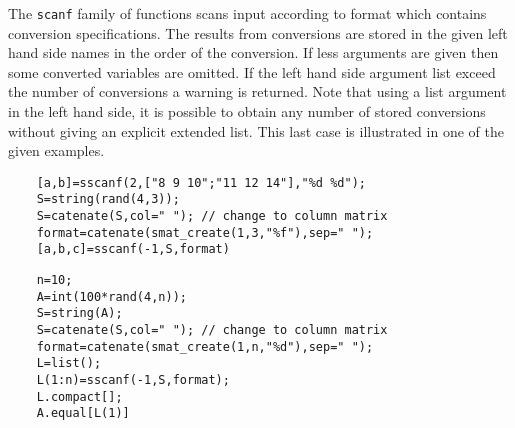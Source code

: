\begin{mandescription}
  The \verb+scanf+ family of functions scans input according to format which contains 
  conversion specifications. The results from conversions are stored in the 
  given left hand side names in the order of the conversion. If less arguments are 
  given then some converted variables are omitted. If the left hand side argument 
  list exceed the number of conversions a warning is returned. 
  Note that using a list argument in the left hand side, it is possible to 
  obtain any number of stored conversions without giving an explicit extended list. 
  This last case is illustrated in one of the given examples. 
\end{mandescription}
\begin{examples}
  \begin{Verbatim}
    [a,b]=sscanf(2,["8 9 10";"11 12 14"],"%d %d");
    S=string(rand(4,3));
    S=catenate(S,col=" "); // change to column matrix
    format=catenate(smat_create(1,3,"%f"),sep=" ");
    [a,b,c]=sscanf(-1,S,format)
  \end{Verbatim}

  \begin{Verbatim}
    n=10;
    A=int(100*rand(4,n));
    S=string(A);
    S=catenate(S,col=" "); // change to column matrix
    format=catenate(smat_create(1,n,"%d"),sep=" ");
    L=list();
    L(1:n)=sscanf(-1,S,format);
    L.compact[];
    A.equal[L(1)]
  \end{Verbatim}

\end{examples}
\begin{manseealso}
\end{manseealso}

